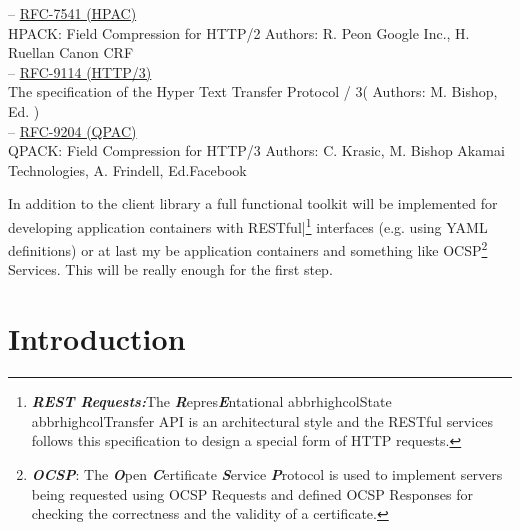 \documentclass[10pt,a4paper,english]{article}
\newcommand{\abbrhighcol}[1]{\textbf{\textit{#1}}}
\begin{document}
\begin{multicols}{2}
\begin{flushleft}
\hspace*{1em}-- \href{https://www.rfc-editor.org/rfc/pdfrfc/rfc7541.txt.pdf}{RFC-7541 (HPAC)} \\HPACK: Field Compression for HTTP/2 Authors:  R. Peon Google Inc., H. Ruellan Canon CRF\\
\hspace*{1em}-- \href{https://www.rfc-editor.org/rfc/rfc9114.pdf}{RFC-9114 (HTTP/3)} \\The specification of the Hyper Text Transfer Protocol / 3( Authors: M. Bishop, Ed. ) \\
\hspace*{1em}-- \href{https://www.rfc-editor.org/rfc/rfc9204.pdf}{RFC-9204 (QPAC)} \\QPACK: Field Compression for HTTP/3 Authors: C. Krasic, M. Bishop Akamai Technologies,
A. Frindell, Ed.Facebook
\end{flushleft}
\begin{flushleft}
In addition to the client library a full  functional toolkit will be implemented for developing application containers with RESTful|\footnote{\abbrhighcol {REST Requests:}The \abbrhighcol {R}epres\abbrhighcol  {E}ntational abbrhighcol{S}tate abbrhighcol{T}ransfer API is an architectural style and the RESTful services follows this specification to design a special form of HTTP requests.} interfaces (e.g. using YAML definitions) or at last my be application containers and something like OCSP\footnote{ \abbrhighcol {OCSP}: The \abbrhighcol  {O}pen \abbrhighcol {C}ertificate \abbrhighcol  {S}ervice \abbrhighcol  {P}rotocol is used to implement servers being requested using OCSP Requests and defined OCSP  Responses for checking the correctness and the validity of a certificate.} Services.
This will be really enough for the first step.
\end{flushleft}

\section{Introduction}


\end{multicols}
\end{document}
